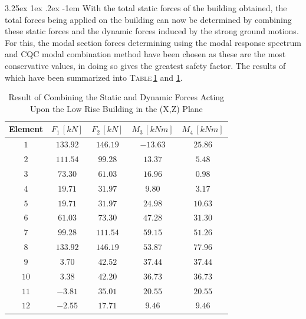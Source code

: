 \documentclass[11pt,a4paper,titlepage]{report}
\makeatletter
\renewcommand\paragraph{\@startsection{paragraph}{5}{\z@}%
  {3.25ex \@plus1ex \@minus.2ex}%
  {-1em}%
  {\normalfont\normalsize\bfseries}}
\makeatother
\begin{document}
\paragraph{}With the total static forces of the building obtained, the total forces being applied on the building can now be determined by combining these static forces and the dynamic forces induced by the strong ground motions. For this, the modal section forces determining using the modal response spectrum and CQC modal combination method have been chosen as these are the most conservative values, in doing so gives the greatest safety factor. The results of which have been summarized into \textsc{Table}\,\ref{tab:dynamic and static x} and \ref{tab:dynamic and static x}.
\begin{table}[h]
    \centering
    \begin{tabular}{c|c|c|c|c}
      Element & $F_1 \,[kN]$ & $F_2 \,[kN]$ & $M_3\, [kNm]$ & $M_4 \,[kNm]$  \\
         \hline
       $1$ & $133.92$ & $146.19$ & $-13.63$ & $25.86$ \\
       $2$ & $111.54$ & $99.28$ & $13.37$ & $5.48$ \\
       $3$ & $73.30$ & $61.03$ & $16.96 $ & $0.98$ \\
       $4$ & $19.71$ & $31.97$ & $9.80$ & $3.17 $ \\
       $5$ & $19.71$ & $31.97$ & $24.98$ & $10.63$ \\
       $6$ & $61.03$ & $73.30$ & $47.28$ & $31.30$ \\
       $7$ & $99.28$ & $111.54$ & $59.15$ & $51.26$ \\
       $8$ & $133.92$ & $146.19$ & $53.87$ & $77.96$ \\
       $9$ & $3.70$ & $42.52 $ & $37.44$ & $37.44$ \\
       $10$ & $3.38$ & $42.20$ & $36.73$ & $36.73$ \\
       $11$ & $-3.81$ & $35.01$ & $20.55$ & $20.55$ \\
       $12$ & $-2.55$ & $17.71$ & $9.46$ & $9.46$ \\
    \end{tabular}
    \caption{Result of Combining the Static and Dynamic Forces Acting Upon the Low Rise Building in the (X,Z) Plane}
    \label{tab:dynamic and static x}
\end{table}
\end{document}
